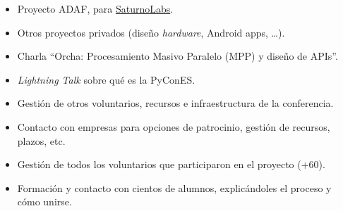 \documentclass[10pt,a4paper,ragged2e]{altacv}
\begin{document}
\begin{itemize}
  \item Proyecto ADAF, para \href{https://saturnolabs.com/}{SaturnoLabs}.
  \item Otros proyectos privados (diseño \textit{hardware}, Android apps, \dots).
\end{itemize}



\begin{itemize}
  \item Charla ``Orcha: Procesamiento Masivo Paralelo (MPP) y diseño de APIs''.
  \item \textit{Lightning Talk} sobre qué es la PyConES.
\end{itemize}

\divider


\begin{itemize}
  \item Gestión de otros voluntarios, recursos e infraestructura de la conferencia.
  \item Contacto con empresas para opciones de patrocinio, gestión de recursos, plazos, etc.
\end{itemize}

\divider


\begin{itemize}
  \item Gestión de todos los voluntarios que participaron en el proyecto (+60).
  \item Formación y contacto con cientos de alumnos, explicándoles el proceso y cómo unirse.
\end{itemize}


\clearpage


\nocite{*}

{\large {}}
\end{document}
